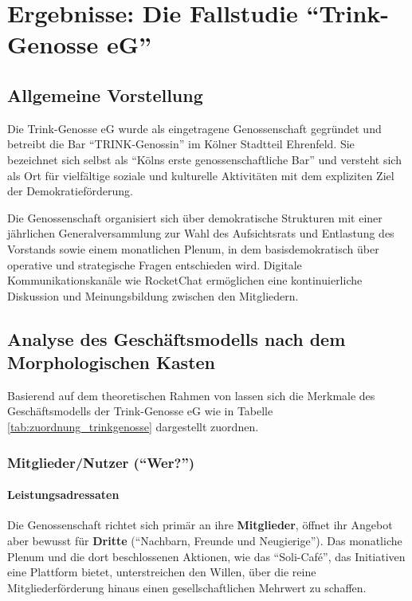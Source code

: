 \section{Ergebnisse: Die Fallstudie \enquote{Trink-Genosse eG}}

\subsection{Allgemeine Vorstellung}

Die Trink-Genosse eG wurde als eingetragene Genossenschaft gegründet und betreibt die Bar \enquote{TRINK-Genossin} im Kölner Stadtteil Ehrenfeld. Sie bezeichnet sich selbst als \enquote{Kölns erste genossenschaftliche Bar} und versteht sich als Ort für vielfältige soziale und kulturelle Aktivitäten mit dem expliziten Ziel der Demokratieförderung.

Die Genossenschaft organisiert sich über demokratische Strukturen mit einer jährlichen Generalversammlung zur Wahl des Aufsichtsrats und Entlastung des Vorstands sowie einem monatlichen Plenum, in dem basisdemokratisch über operative und strategische Fragen entschieden wird. Digitale Kommunikationskanäle wie RocketChat ermöglichen eine kontinuierliche Diskussion und Meinungsbildung zwischen den Mitgliedern.

\subsection{Analyse des Geschäftsmodells nach dem Morphologischen Kasten}

Basierend auf dem theoretischen Rahmen von \textcite{blome-dreesGenossenschaftlicheGeschaeftsmodelleSemantik2023} lassen sich die Merkmale des Geschäftsmodells der Trink-Genosse eG wie in Tabelle \ref{tab:zuordnung_trinkgenosse} dargestellt zuordnen.



\subsubsection{Mitglieder/Nutzer (\enquote{Wer?})}

\paragraph{Leistungsadressaten}
Die Genossenschaft richtet sich primär an ihre \textbf{Mitglieder}, öffnet ihr Angebot aber bewusst für \textbf{Dritte} (\enquote{Nachbarn, Freunde und Neugierige}). Das monatliche Plenum und die dort beschlossenen Aktionen, wie das \enquote{Soli-Café}, das Initiativen eine Plattform bietet, unterstreichen den Willen, über die reine Mitgliederförderung hinaus einen gesellschaftlichen Mehrwert zu schaffen.

